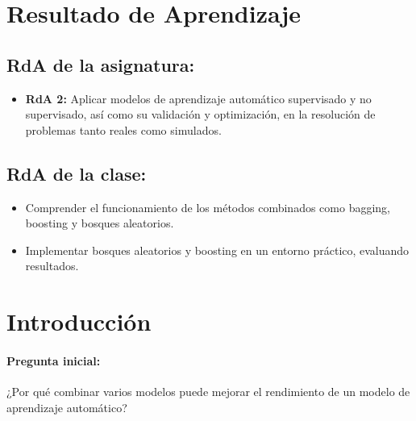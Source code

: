 \documentclass[a4,11pt]{aleph-notas}
\begin{document}
\encabezado


\section*{Resultado de Aprendizaje}

\subsection*{RdA de la asignatura:}
\begin{itemize}[leftmargin=*]
    \item \textbf{RdA 2:} 
    Aplicar modelos de aprendizaje automático supervisado y no supervisado, así como su validación y optimización, en la resolución de problemas tanto reales como simulados.
\end{itemize}

\subsection*{RdA de la clase:}
\begin{itemize}[leftmargin=*]
    \item Comprender el funcionamiento de los métodos combinados como bagging, boosting y bosques aleatorios.  
    \item Implementar bosques aleatorios y boosting en un entorno práctico, evaluando resultados.  
\end{itemize}

\section*{Introducción}

\paragraph{Pregunta inicial:} 
¿Por qué combinar varios modelos puede mejorar el rendimiento de un modelo de aprendizaje automático?  
\end{document}
